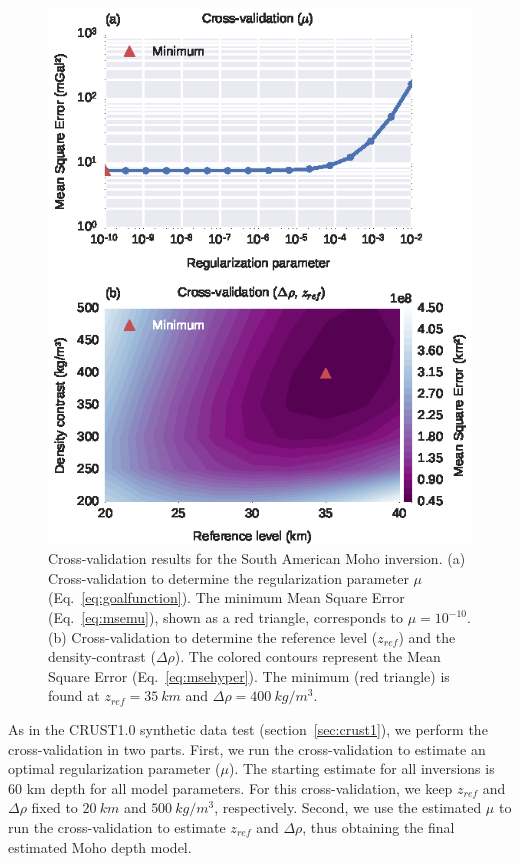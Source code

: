 \documentclass[extra,mreferee]{gji}
\begin{document}
\begin{figure}
    \centering
    \includegraphics{figures/south-america-cv}
    \caption{
        Cross-validation results for the South American Moho inversion.
        (a) Cross-validation to determine the regularization parameter $\mu$
        (Eq.~\ref{eq:goalfunction}).
        The minimum Mean Square Error (Eq.~\ref{eq:msemu}),
        shown as a red triangle,
        corresponds to $\mu = 10^{-10}$.
        (b) Cross-validation to determine
        the reference level ($z_{ref}$) and the density-contrast ($\Delta\rho$).
        The colored contours represent
        the Mean Square Error (Eq.~\ref{eq:msehyper}).
        The minimum (red triangle) is found at $z_{ref} = 35\ km$
        and $\Delta\rho = 400\ kg/m^3$.
    }
    \label{fig:sam-cv}
\end{figure}



As in the CRUST1.0 synthetic data test (section~\ref{sec:crust1}),
we perform the cross-validation in two parts.
First, we run the cross-validation to estimate
an optimal regularization parameter ($\mu$).
The starting estimate for all inversions is
60 km depth for all model parameters.
For this cross-validation,
we keep $z_{ref}$ and $\Delta\rho$ fixed to
$20\ km$ and $500\ kg/m^3$, respectively.
Second, we use the estimated $\mu$ to run the cross-validation
to estimate $z_{ref}$ and $\Delta\rho$,
thus obtaining the final estimated Moho depth model.
\end{document}
